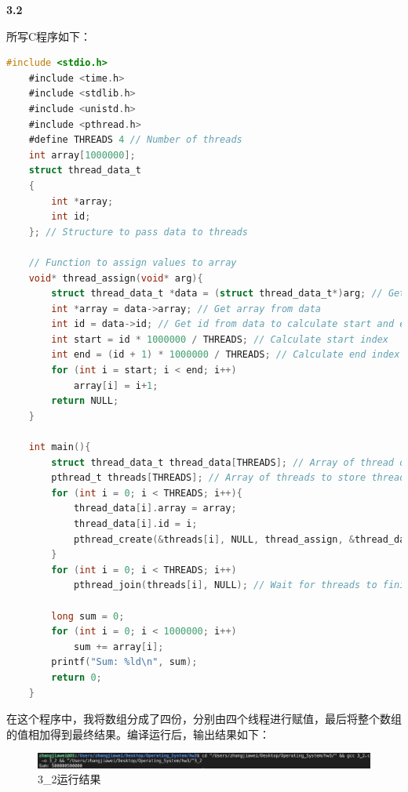 \documentclass[UTF8]{article}
\newcommand{\tbf}[1]{\textbf{#1}}
\begin{document}
\tbf{3.2}

所写C程序如下：

\begin{lstlisting}[language=C]
    #include <stdio.h>
    #include <time.h>
    #include <stdlib.h>
    #include <unistd.h>
    #include <pthread.h>
    #define THREADS 4 // Number of threads
    int array[1000000];
    struct thread_data_t
    {
        int *array;
        int id;
    }; // Structure to pass data to threads
    
    // Function to assign values to array
    void* thread_assign(void* arg){
        struct thread_data_t *data = (struct thread_data_t*)arg; // Get data from argument
        int *array = data->array; // Get array from data
        int id = data->id; // Get id from data to calculate start and end index of current thread
        int start = id * 1000000 / THREADS; // Calculate start index
        int end = (id + 1) * 1000000 / THREADS; // Calculate end index
        for (int i = start; i < end; i++)
            array[i] = i+1;
        return NULL;
    }
    
    int main(){
        struct thread_data_t thread_data[THREADS]; // Array of thread data to pass to threads
        pthread_t threads[THREADS]; // Array of threads to store thread ids
        for (int i = 0; i < THREADS; i++){
            thread_data[i].array = array;
            thread_data[i].id = i;
            pthread_create(&threads[i], NULL, thread_assign, &thread_data[i]); // Create threads and pass data to them
        }
        for (int i = 0; i < THREADS; i++)
            pthread_join(threads[i], NULL); // Wait for threads to finish
    
        long sum = 0;
        for (int i = 0; i < 1000000; i++)
            sum += array[i];
        printf("Sum: %ld\n", sum);
        return 0;
    }
\end{lstlisting}

在这个程序中，我将数组分成了四份，分别由四个线程进行赋值，最后将整个数组的值相加得到最终结果。编译运行后，输出结果如下：

\begin{figure}[H]
    \centering
    \includegraphics[width=\textwidth]{3_2.png}
    \caption{3_2运行结果}
\end{figure}
\end{document}
